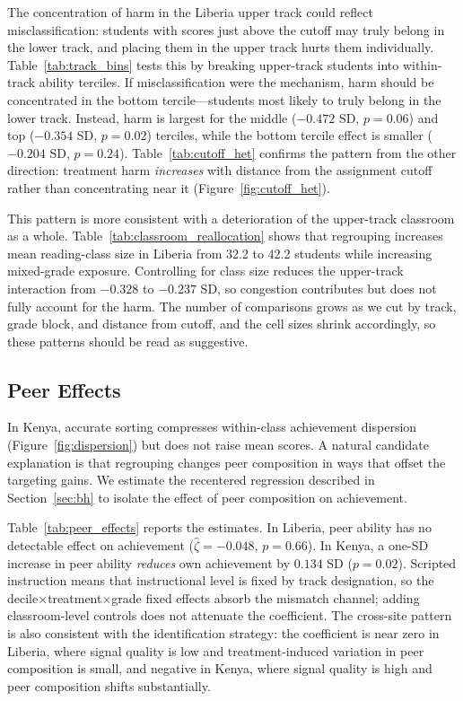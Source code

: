 \documentclass[11pt]{article}
\begin{document}
The concentration of harm in the Liberia upper track could reflect misclassification: students with scores just above the cutoff may truly belong in the lower track, and placing them in the upper track hurts them individually. Table~\ref{tab:track_bins} tests this by breaking upper-track students into within-track ability terciles. If misclassification were the mechanism, harm should be concentrated in the bottom tercile---students most likely to truly belong in the lower track. Instead, harm is largest for the middle ($-0.472$ SD, $p = 0.06$) and top ($-0.354$ SD, $p = 0.02$) terciles, while the bottom tercile effect is smaller ($-0.204$ SD, $p = 0.24$). Table~\ref{tab:cutoff_het} confirms the pattern from the other direction: treatment harm \emph{increases} with distance from the assignment cutoff rather than concentrating near it (Figure~\ref{fig:cutoff_het}).

This pattern is more consistent with a deterioration of the upper-track classroom as a whole. Table~\ref{tab:classroom_reallocation} shows that regrouping increases mean reading-class size in Liberia from 32.2 to 42.2 students while increasing mixed-grade exposure. Controlling for class size reduces the upper-track interaction from $-0.328$ to $-0.237$ SD, so congestion contributes but does not fully account for the harm. The number of comparisons grows as we cut by track, grade block, and distance from cutoff, and the cell sizes shrink accordingly, so these patterns should be read as suggestive.

\subsection{Peer Effects}

In Kenya, accurate sorting compresses within-class achievement dispersion (Figure~\ref{fig:dispersion}) but does not raise mean scores. A natural candidate explanation is that regrouping changes peer composition in ways that offset the targeting gains. We estimate the recentered regression described in Section~\ref{sec:bh} to isolate the effect of peer composition on achievement.

Table~\ref{tab:peer_effects} reports the estimates. In Liberia, peer ability has no detectable effect on achievement ($\hat{\zeta} = -0.048$, $p = 0.66$). In Kenya, a one-SD increase in peer ability \emph{reduces} own achievement by $0.134$ SD ($p = 0.02$). Scripted instruction means that instructional level is fixed by track designation, so the decile$\times$treatment$\times$grade fixed effects absorb the mismatch channel; adding classroom-level controls does not attenuate the coefficient. The cross-site pattern is also consistent with the identification strategy: the coefficient is near zero in Liberia, where signal quality is low and treatment-induced variation in peer composition is small, and negative in Kenya, where signal quality is high and peer composition shifts substantially.
\end{document}
